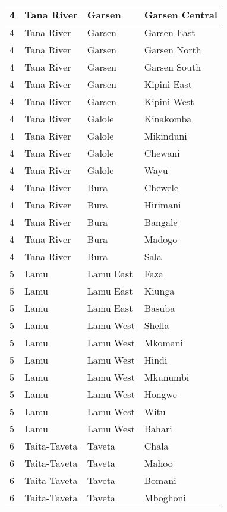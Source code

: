 \begin{table}[!ht]
\begin{tabular}{|l|l|l|l|}
        4 & Tana River & Garsen & Garsen Central \\ \hline
        4 & Tana River & Garsen & Garsen East \\ \hline
        4 & Tana River & Garsen & Garsen North \\ \hline
        4 & Tana River & Garsen & Garsen South \\ \hline
        4 & Tana River & Garsen & Kipini East \\ \hline
        4 & Tana River & Garsen & Kipini West \\ \hline
        4 & Tana River & Galole & Kinakomba \\ \hline
        4 & Tana River & Galole & Mikinduni \\ \hline
        4 & Tana River & Galole & Chewani \\ \hline
        4 & Tana River & Galole & Wayu \\ \hline
        4 & Tana River & Bura & Chewele \\ \hline
        4 & Tana River & Bura & Hirimani \\ \hline
        4 & Tana River & Bura & Bangale \\ \hline
        4 & Tana River & Bura & Madogo \\ \hline
        4 & Tana River & Bura & Sala \\ \hline
        5 & Lamu & Lamu East & Faza \\ \hline
        5 & Lamu & Lamu East & Kiunga \\ \hline
        5 & Lamu & Lamu East & Basuba \\ \hline
        5 & Lamu & Lamu West & Shella \\ \hline
        5 & Lamu & Lamu West & Mkomani \\ \hline
        5 & Lamu & Lamu West & Hindi \\ \hline
        5 & Lamu & Lamu West & Mkunumbi \\ \hline
        5 & Lamu & Lamu West & Hongwe \\ \hline
        5 & Lamu & Lamu West & Witu \\ \hline
        5 & Lamu & Lamu West & Bahari \\ \hline
        6 & Taita-Taveta & Taveta & Chala \\ \hline
        6 & Taita-Taveta & Taveta & Mahoo \\ \hline
        6 & Taita-Taveta & Taveta & Bomani \\ \hline
        6 & Taita-Taveta & Taveta & Mboghoni \\ \hline

\end{tabular}
\end{table}
